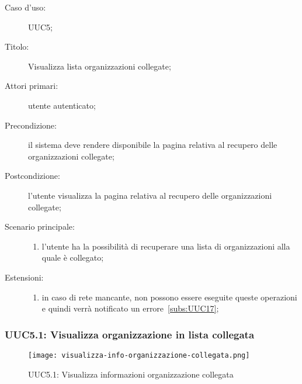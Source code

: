 \documentclass[../../../analisi-dei-requisiti.tex]{subfiles}
\begin{document}
\begin{description}
  \item[Caso d’uso:] UUC5;
  \item[Titolo:] Visualizza lista organizzazioni collegate;
  \item[Attori primari:] utente autenticato;
  \item[Precondizione:] il sistema deve rendere disponibile la pagina relativa al recupero delle organizzazioni collegate;
  \item[Postcondizione:] l'utente visualizza la pagina relativa al recupero delle organizzazioni collegate;
  \item[Scenario principale:]
        \begin{enumerate}
          \item l'utente ha la possibilità di recuperare una lista di organizzazioni alla quale è collegato;
        \end{enumerate}
  \item[Estensioni:]
        \begin{enumerate}
          \item in caso di rete mancante, non possono essere eseguite queste operazioni e quindi verrà notificato un errore~\ref{subs:UUC17};
        \end{enumerate}
\end{description}

\subsubsection{UUC5.1: Visualizza organizzazione in lista collegata}%
\label{subs:UUC5.1}

\begin{figure}[H]
  \centering
  \texttt{[image: visualizza-info-organizzazione-collegata.png]}
  \caption{UUC5.1: Visualizza informazioni organizzazione collegata}%
  \label{fig:UUC5.1}
\end{figure}
\end{document}
